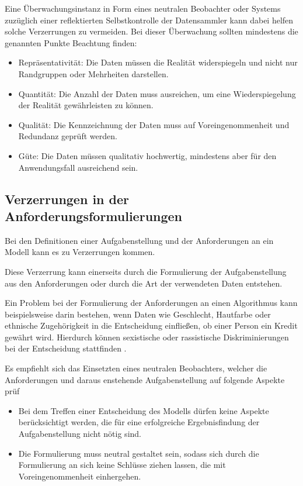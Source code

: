 \documentclass[12pt]{report}
\begin{document}
Eine Überwachungsinstanz in Form eines neutralen Beobachter oder Systems zuzüglich einer reflektierten Selbstkontrolle der Datensammler kann dabei helfen solche Verzerrungen zu vermeiden.
Bei dieser Überwachung sollten mindestens die genannten Punkte Beachtung finden:
\begin{itemize}

    \item Repräsentativität: Die Daten müssen die Realität widerspiegeln und nicht nur Randgruppen oder Mehrheiten darstellen.
    \item Quantität: Die Anzahl der Daten muss ausreichen,  um eine Wiederspiegelung der Realität gewährleisten zu können.
    \item Qualität: Die Kennzeichnung der Daten muss auf Voreingenommenheit und Redundanz geprüft werden.
    \item Güte: Die Daten müssen qualitativ hochwertig, mindestens aber für den Anwendungsfall ausreichend sein.

\end{itemize}

\subsection{Verzerrungen in der Anforderungsformulierungen}
Bei den Definitionen einer Aufgabenstellung und der Anforderungen an ein Modell kann es zu Verzerrungen kommen.

Diese Verzerrung kann einerseits durch die Formulierung der Aufgabenstellung aus den Anforderungen oder durch die Art der verwendeten Daten entstehen.  \cite[S. 51f.]{Srinivasan}

Ein Problem bei der Formulierung der Anforderungen an einen Algorithmus kann beispielsweise darin bestehen, wenn Daten wie Geschlecht, Hautfarbe oder ethnische Zugehörigkeit in die Entscheidung einfließen, ob einer Person ein Kredit gewährt wird. Hierdurch können sexistische oder rassistische Diskriminierungen bei der Entscheidung stattfinden \cite[S. 51f.]{Srinivasan}.

Es empfiehlt sich das Einsetzten eines neutralen Beobachters, welcher die Anforderungen und daraus enstehende Aufgabenstellung auf folgende Aspekte prüf
\begin{itemize}
    \item Bei dem Treffen einer Entscheidung des Modells dürfen keine Aspekte berücksichtigt werden, die für eine erfolgreiche Ergebnisfindung der Aufgabenstellung nicht nötig sind.
    \item Die Formulierung muss neutral gestaltet sein, sodass sich durch die Formulierung an sich keine Schlüsse ziehen lassen, die mit Voreingenommenheit einhergehen.
\end{itemize}
\end{document}

